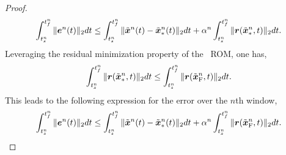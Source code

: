 \begin{proof}
\begin{equation*}
\int_{t_s^{n}}^{t_f^{n}} \| \boldsymbol e^{n}(t) \|_2 dt \le \int_{t_s^{n}}^{t_f^{n}} \| \tilde{\boldsymbol x}^{n}(t) - \tilde{\boldsymbol x}_{*}^{n}(t) \|_2 dt + \alpha^{n} \int_{t_s^{n}}^{t_f^{n}} \|  \boldsymbol r(\tilde{\boldsymbol x}_{*}^{n},t)  \|_2 dt.
\end{equation*}
Leveraging the residual minimization property of the \methodAcronym\ ROM, one has, 
$$ \int_{t_s^{n}}^{t_f^{n}} \| \boldsymbol r(\tilde{\boldsymbol x}_{*}^{n},t) \|_2dt \le \int_{t_s^{n}}^{t_f^{n}} \| \boldsymbol r(\tilde{\boldsymbol x}_{\text{F}}^{n},t) \|_2dt.$$
This leads to the following expression for the error over the $n$th window,
\begin{equation}\label{eq:boundtmp}
\int_{t_s^{n}}^{t_f^{n}} \| \boldsymbol e^{n}(t) \|_2 dt \le \int_{t_s^{n}}^{t_f^{n}} \| \tilde{\boldsymbol x}^{n}(t) - \tilde{\boldsymbol x}_{*}^{n}(t) \|_2 dt + \alpha^{n} \int_{t_s^{n}}^{t_f^{n}} \|  \boldsymbol r(\tilde{\boldsymbol x}_{\text{F}}^{n},t)  \|_2 dt.
\end{equation}
\begin{comment}
To obtain an expression for $\norm{\stateROMSolArg{n}{t} - \stateROMStarSolArgt{n}{t}}$ start by noting that
$\stateROMStarSolArg{n}$ and $\stateROMSolArg{n}$ are defined by the systems,
\begin{align*} 
&\frac{d}{dt} \genstateROMSolArg{n}   -
\basisspace^T  \velocity(\basisspace \genstateROMSolArg{n} + \stateIntercept,t) =  \adjointROMSolArg{n} , \\
 &\frac{d}{dt} \adjointROMSolArg{n} + \basisspace^T \bigg[\frac{\partial
\velocity}{\partial \stateyDiscrete}(\basisspace \genstateROMSolArg{n} +
\stateIntercept,t)\bigg]^T \basisspace \adjointROMSolArg{n} = \basisspace^T \bigg[
\frac{\partial \velocity}{\partial \stateyDiscrete} (\basisspace \genstateROMSolArg{n} +
\stateIntercept,t) \bigg]^T \bigg( \mathbf{I} -   \basisspace \basisspace^T
\bigg)    \velocity(\basisspace \genstateROMSolArg{n} + \stateIntercept,t) , \\  
& \genstateROMSolArgt{n}{\timeStartArg{n}} =
\begin{cases} \genstateROMSolArgt{n-1}{\timeEndArg{n-1}} & n=2,\ldots,\nslabs, \\
\basisspace^T(\approxstateIC - \stateIntercept) & n=1, \end{cases}\\

\end{comment}
\end{proof}
